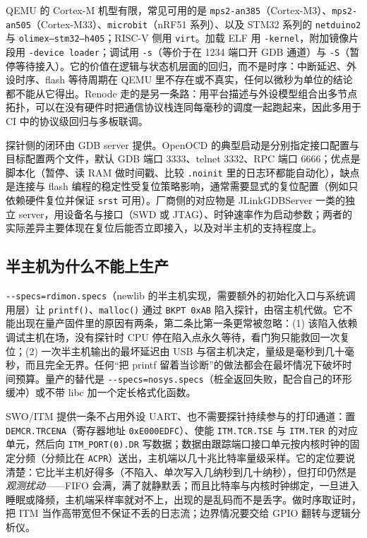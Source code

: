 \documentclass[12pt,a4paper,fontset=fandol]{ctexbook}
\newcommand{\Fn}[1]{\texttt{#1()}}
\newcommand{\Tp}[1]{\texttt{#1}}
\newcommand{\Opt}[1]{\texttt{-\/-#1}}
\newcommand{\Bk}{\discretionary{}{}{}}
\begin{document}
QEMU 的 Cortex-M 机型有限，常见可用的是 \Tp{mps2-an385}（Cortex-M3）、\Tp{mps2-an505}（Cortex-M33）、\Tp{microbit}（nRF51 系列）、以及 STM32 系列的 \Tp{netduino2} 与 \Tp{olimex--{\Bk}stm32--{\Bk}h405}；RISC-V 侧用 \Tp{virt}。加载 ELF 用 \Tp{-kernel}，附加镜像片段用 \Tp{-device loader}；调试用 \Tp{-s}（等价于在 1234 端口开 GDB 通道）与 \Tp{-S}（暂停等待接入）。它的价值在逻辑与状态机层面的回归，而不是时序：中断延迟、外设时序、flash 等待周期在 QEMU 里不存在或不真实，任何以微秒为单位的结论都不能从它得出。Renode 走的是另一条路：用平台描述与外设模型组合出多节点拓扑，可以在没有硬件时把通信协议栈连同每毫秒的调度一起跑起来，因此多用于 CI 中的协议级回归与多板联调。

探针侧的闭环由 GDB server 提供。OpenOCD 的典型启动是分别指定接口配置与目标配置两个文件，默认 GDB 端口 3333、telnet 3332、RPC 端口 6666；优点是脚本化（暂停、读 RAM 做时间戳、比较 \Tp{.noinit} 里的日志环都能自动化），缺点是连接与 flash 编程的稳定性受复位策略影响，通常需要显式的复位配置（例如只依赖硬件复位并保证 \Tp{srst} 可用）。厂商侧的对应物是 JLinkGDBServer 一类的独立 server，用设备名与接口（SWD 或 JTAG）、时钟速率作为启动参数；两者的实际差异主要体现在复位后能否立即接入，以及对半主机的支持程度上。

\subsection{半主机为什么不能上生产}

\Opt{specs=rdimon.specs}（newlib 的半主机实现，需要额外的初始化入口与系统调用层）让 \Fn{printf}、\Fn{malloc} 通过 \Tp{BKPT 0xAB} 陷入探针，由宿主机代做。它不能出现在量产固件里的原因有两条，第二条比第一条更常被忽略：(1) 该陷入依赖调试主机在场，没有探针时 CPU 停在陷入点永久等待，看门狗只能救回一次复位；(2) 一次半主机输出的最坏延迟由 USB 与宿主机决定，量级是毫秒到几十毫秒，而且完全无界。任何``把 printf 留着当诊断''的做法都会在最坏情况下破坏时间预算。量产的替代是 \Opt{specs=nosys.specs}（桩全返回失败，配合自己的环形缓冲）或不带 libc 加一个定长格式化函数。

SWO/ITM 提供一条不占用外设 UART、也不需要探针持续参与的打印通道：置 \Tp{DEMCR.TRCENA}（寄存器地址 \Tp{0xE000EDFC}）、使能 \Tp{ITM.TCR.TSE} 与 \Tp{ITM.TER} 的对应单元，然后向 \Tp{ITM\_PORT(0).DR} 写数据；数据由跟踪端口接口单元按内核时钟的固定分频（分频比在 \Tp{ACPR}）送出，主机端以几十兆比特率量级采样。它的定位要说清楚：它比半主机好得多（不陷入、单次写入几纳秒到几十纳秒），但打印仍然是\emph{观测扰动}——FIFO 会满，满了就静默丢；而且比特率与内核时钟绑定，一旦进入睡眠或降频，主机端采样率就对不上，出现的是乱码而不是丢字。做时序取证时，把 ITM 当作高带宽但不保证不丢的日志流；边界情况要交给 GPIO 翻转与逻辑分析仪。
\end{document}
